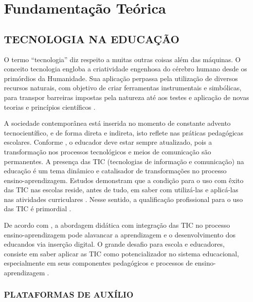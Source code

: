 
\chapter{\textbf{Fundamentação Teórica}} %
\sloppy %

\section{TECNOLOGIA NA EDUCAÇÃO}

O termo ``tecnologia'' diz respeito a muitas outras coisas além das máquinas. O conceito tecnologia engloba a criatividade engenhosa do cérebro humano desde os primórdios da Humanidade. Sua aplicação perpassa pela utilização de diversos recursos naturais, com objetivo de criar ferramentas instrumentais e simbólicas, para transpor barreiras impostas pela natureza até aos testes e aplicação de novas teorias e princípios científicos \cite{kenski2007educaccao}.

A sociedade contemporânea está inserida no momento de constante advento tecnocientífico, e de forma direta e indireta, isto reflete nas práticas pedagógicas escolares. Conforme , o educador deve estar sempre atualizado, pois a transformação nos processos tecnológicos e meios de comunicação são permanentes. A presença das TIC (tecnologias de informação e comunicação) na educação é um tema dinâmico e catalisador de transformações no processo ensino-aprendizagem. Estudos demonstram que a condição para o uso com êxito das TIC nas escolas reside, antes de tudo, em saber com utilizá-las e aplicá-las nas atividades curriculares \cite{noeth2004evaluating}. Nesse sentido, a qualificação profissional para o uso das TIC é primordial \cite{david2008padroes}.

De acordo com , a abordagem didática com integração das TIC no processo ensino-aprendizagem pode alavancar a aprendizagem e o desenvolvimento dos educandos via inserção digital. O grande desafio para escola e educadores, consiste em saber aplicar as TIC como potencializador no sistema educacional, especialmente em seus componentes pedagógicos e processos de ensino-aprendizagem \cite{libaneoorganizacao}.

\subsection{PLATAFORMAS DE AUXÍLIO}

